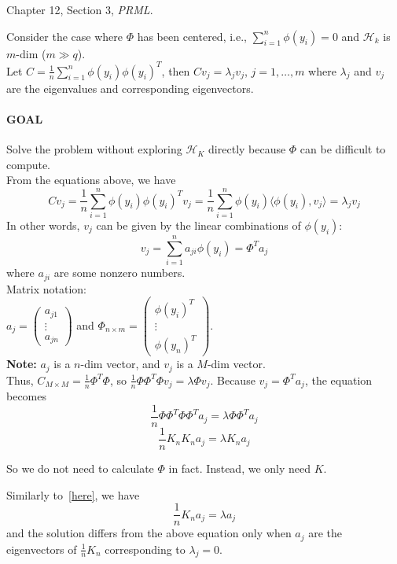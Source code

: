 \documentclass[12pt]{book}
\theoremstyle{definition}
\theoremstyle{remark}
\begin{document}
\begin{referencebox}
    Chapter 12, Section 3, \textit{PRML}.
\end{referencebox}


Consider the case where $\Phi$ has been centered, i.e., $\sum_{i=1}^n \phi(y_i) = 0$ and $\mathcal{H}_k$ is $m$-dim ($m\gg q$).\\

Let $C = \frac1n\sum_{i=1}^n\phi(y_i)\phi(y_i)^T$, then $C v_j = \lambda_j v_j$, $j = 1,\dots, m$ where $\lambda_j$ and $v_j$ are the eigenvalues and corresponding eigenvectors. 

\paragraph{GOAL} Solve the problem without exploring $\mathcal{H}_K$ directly because $\Phi$ can be difficult to compute.\\

From the equations above, we have
\[Cv_j = \frac1n\sum_{i=1}^n\phi(y_i)\phi(y_i)^Tv_j = \frac1n\sum_{i=1}^n\phi(y_i)\langle\phi(y_i), v_j\rangle = \lambda_j v_j\]
In other words, $v_j$ can be given by the linear combinations of $\phi(y_i)$:
\[v_j = \sum_{i=1}^n a_{ji}\phi(y_i) = \Phi^Ta_j\]
where $a_{ji}$ are some nonzero numbers.\\
Matrix notation:\\
$a_j = \begin{pmatrix}
 a_{j1}
 \\\vdots
\\a_{jn}
\end{pmatrix}$ and $\Phi_{n\times m} = \begin{pmatrix}
 \phi(y_i)^T
 \\\vdots
\\\phi(y_n)^T
\end{pmatrix}$.\\

\textbf{Note: }$a_j$ is a $n$-dim vector, and $v_j$ is a $M$-dim vector.\\

Thus, $C_{M\times M} = \frac1n\Phi^T\Phi$, so $\frac1n\Phi\Phi^T\Phi v_j = \lambda\Phi v_j$. Because $v_j =\Phi^Ta_j$, the equation becomes
\[\frac1n\Phi\Phi^T\Phi\Phi^Ta_j = \lambda \Phi\Phi^Ta_j\]
\[\frac1nK_nK_na_j = \lambda K_na_j\]

So we do not need to calculate $\Phi$ in fact. Instead, we only need $K$.

Similarly to~\ref{here}, we have \[\frac1nK_na_j = \lambda a_j\]
and the solution differs from the above equation only when $a_j$ are the eigenvectors of $\frac1nK_n$ corresponding to $\lambda_j = 0$.\\
\end{document}
